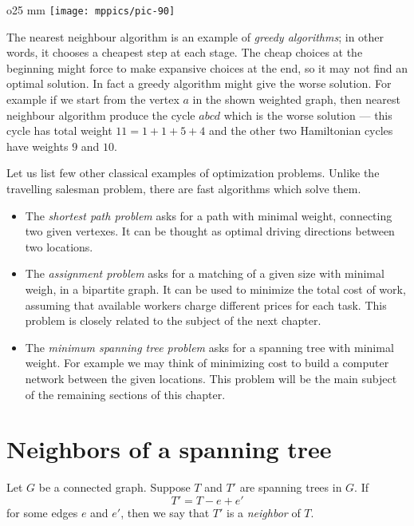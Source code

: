 \begin{wrapfigure}{o}{25 mm}
\vskip-0mm
\centering
\texttt{[image: mppics/pic-90]}
\end{wrapfigure}

The nearest neighbour algorithm is an example of \emph{greedy algorithms}; in other words, it chooses a cheapest step at each stage.
The cheap choices at the beginning might force to make expansive choices at the end,
so it may not find an optimal solution. 
In fact a greedy algorithm might give the worse solution.
For example if we start from the vertex $a$ in the shown weighted graph, then nearest neighbour algorithm produce the cycle $abcd$ which is the worse solution --- this cycle has total weight $11=1+1+5+4$ and the other two  Hamiltonian cycles have weights $9$ and $10$.

Let us list few other classical examples of optimization problems.
Unlike the travelling salesman problem, there are fast algorithms which solve them.
\begin{itemize}
\item The \emph{shortest path problem} asks for a path with minimal weight, connecting two given vertexes.
It can be thought as optimal driving directions between two locations.
\item The \label{assignment problem}\emph{assignment problem}  asks for a matching of a given size with minimal weigh, in a bipartite graph.
It can be used to minimize the total cost of work, assuming that available workers charge different prices for each task.
This problem is closely related to the subject of the next chapter.
\item The \emph{minimum spanning tree problem} asks for a spanning tree with minimal weight.
For example we may think of minimizing cost to build a computer network between the given locations.
This problem will be the main subject of the remaining sections of this chapter.
\end{itemize}


\section*{Neighbors of a spanning tree}

Let $G$ be a connected graph.
Suppose $T$ and $T'$ are spanning trees in $G$.
If 
\[T'=T-e+e'\]
for some edges $e$ and $e'$,
then we say that $T'$ is a \emph{neighbor} of $T$.

